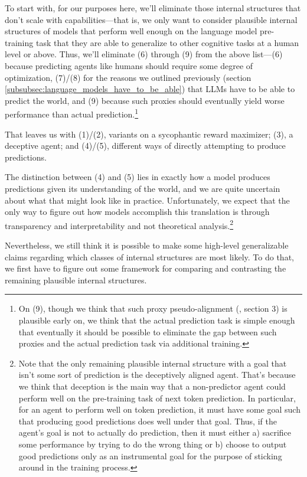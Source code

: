 \documentclass[
  onecolumn,
  nonatbib,
]{miri-tech-article}
\begin{document}
To start with, for our purposes here, we'll eliminate those internal structures that don't scale with capabilities---that is, we only want to consider plausible internal structures of models that perform well enough on the language model pre-training task that they are able to generalize to other cognitive tasks at a human level or above. Thus, we'll eliminate (6) through (9)  from the above list---(6) because predicting agents like humans should require some degree of optimization, (7)/(8) for the reasons we outlined previously (section \ref{subsubsec:language_models_have_to_be_able}) that LLMs have to be able to predict the world, and (9) because such proxies should eventually yield worse performance than actual prediction.\footnote{On (9), though we think that such proxy pseudo-alignment (\cite{risks}, section 3) is plausible early on, we think that the actual prediction task is simple enough that eventually it should be possible to eliminate the gap between such proxies and the actual prediction task via additional training.}

That leaves us with (1)/(2), variants on a sycophantic\cite{why_ai_alignment_hard} reward maximizer; (3), a deceptive agent; and (4)/(5), different ways of directly attempting to produce predictions.

The distinction between (4) and (5) lies in exactly how a model produces predictions given its understanding of the world, and we are quite uncertain about what that might look like in practice. Unfortunately, we expect that the only way to figure out how models accomplish this translation is through transparency and interpretability and not theoretical analysis.\footnote{Note that the only remaining plausible internal structure with a goal that isn't some sort of prediction is the deceptively aligned agent. That's because we think that deception is the main way that a non-predictor agent could perform well on the pre-training task of next token prediction. In particular, for an agent to perform well on token prediction, it must have some goal such that producing good predictions does well under that goal. Thus, if the agent's goal is not to actually do prediction, then it must either a) sacrifice some performance by trying to do the wrong thing or b) choose to output good predictions only as an instrumental goal for the purpose of sticking around in the training process.}

Nevertheless, we still think it is possible to make some high-level generalizable claims regarding which classes of internal structures are most likely. To do that, we first have to figure out some framework for comparing and contrasting the remaining plausible internal structures.
\end{document}
